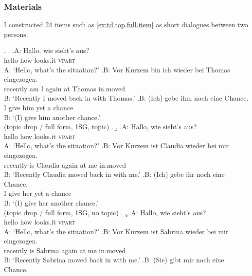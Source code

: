 \largerpage
\subsubsection{Materials}\label{sec:exp.top.s.fv.materials}
I constructed 24 items such as \ref{ex:td.top.full.item} as short dialogues between two persons.

\ex.\label{ex:td.top.full.item}
\a.\label{ex:td.top.full.itema}
\ag.\label{ex:td.top.full.itemai}A: Hallo, wie sieht's aus?\\
{} hello how looks.it \textsc{vpart}\\
 A: `Hello, what's the situation?'
\bg.\label{ex:td.top.full.itemaii}B: {Vor Kurzem} bin ich wieder bei Thomas eingezogen.\\
{} recently am I again at Thomas in.moved\\
B: `Recently I moved back in with Thomas.'
\cg.\label{ex:td.top.full.itemaiii}B: (Ich) gebe ihm noch eine Chance.\\
{} I give him yet a chance\\
B: `(I) give him another chance.' \\\phantom{.}\hfill (topic drop / full form, 1SG, topic)
\z.
\b.\label{ex:td.top.full.itemb}
\ag.\label{ex:td.top.full.itembi}A: Hallo, wie sieht's aus?\\
{} hello how looks.it \textsc{vpart}\\
 A: `Hello, what's the situation?'
\bg.\label{ex:td.top.full.itembii}B: {Vor Kurzem} ist Claudia wieder bei mir eingezogen.\\
{} recently is Claudia again at me in.moved\\
B: `Recently Claudia moved back in with me.'
\cg.\label{ex:td.top.full.itembiii}B: (Ich) gebe ihr noch eine Chance.\\
{} I give her yet a chance\\
B: `(I) give her another chance.' \\\phantom{.}\hfill(topic drop / full form, 1SG, no topic)
\z.
\c.\label{ex:td.top.full.itemc}
\ag.\label{ex:td.top.full.itemci}A: Hallo, wie sieht's aus?\\
{} hello how looks.it \textsc{vpart}\\
 A: `Hello, what's the situation?'
\bg.\label{ex:td.top.full.itemcii}B: {Vor Kurzem} ist Sabrina wieder bei mir eingezogen.\\
{} recently is Sabrina again at me in.moved\\
B: `Recently Sabrina moved back in with me.'
\cg.\label{ex:td.top.full.itemciii}B: (Sie) gibt mir noch eine Chance.\\
